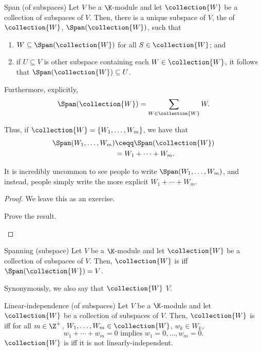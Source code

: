 \begin{thm}{Span (of subspaces)}{}
	Let $V$ be a $\K$-module and let $\collection{W}$ be a collection of subspaces of $V$.  Then, there is a unique subspace of $V$, the  of $\collection{W}$, $\Span (\collection{W})$, such that
	\begin{enumerate}
		\item $W\subseteq \Span (\collection{W})$ for all $S\in \collection{W}$; and
		\item if $U\subseteq V$ is other subspace containing each $W\in \collection{W}$, it follows that $\Span (\collection{W})\subseteq U$.
	\end{enumerate}
	Furthermore, explicitly,
	\begin{equation}
		\Span (\collection{W})=\sum _{W\in \collection{W}}W.
	\end{equation}
	\begin{rmk}
		Thus, if $\collection{W}=\{ W_1,\ldots ,W_m\}$, we have that
		\begin{equation}
			\begin{split}
				\Span (W_1,\ldots ,W_m) & \ceqq \Span (\collection{W}) \\
				& =W_1+\cdots +W_m.
			\end{split}
		\end{equation}
	\end{rmk}
	\begin{rmk}
		It is incredibly uncommon to see people to write $\Span (W_1,\ldots ,W_m)$, and instead, people simply write the more explicit $W_1+\cdots +W_m$.
	\end{rmk}
	\begin{proof}
		We leave this as an exercise.
		\begin{exr}[breakable=false]{}{}
			Prove the result.
		\end{exr}
	\end{proof}
\end{thm}
\begin{dfn}{Spanning (subspace)}{}
	Let $V$ be a $\K$-module and let $\collection{W}$ be a collection of subspaces of $V$.  Then, $\collection{W}$ is  iff $\Span (\collection{W})=V$.
	\begin{rmk}
		Synonymously, we also say that $\collection{W}$  $V$.
	\end{rmk}
\end{dfn}
\begin{dfn}{Linear-independence (of subspaces)}{}
	Let $V$ be a $\K$-module and let $\collection{W}$  be a collection of subspaces of $V$.  Then, $\collection{W}$ is  iff for all $m\in \Z ^+$, $W_1,\ldots ,W_m\in \collection{W}$, $w_k\in W_k$,
	\begin{equation}
		w_1+\cdots +w_m=0\text{ implies }w_1=0,\ldots ,w_m=0.
	\end{equation}
	$\collection{W}$ is  iff it is not linearly-independent.
\end{dfn}
